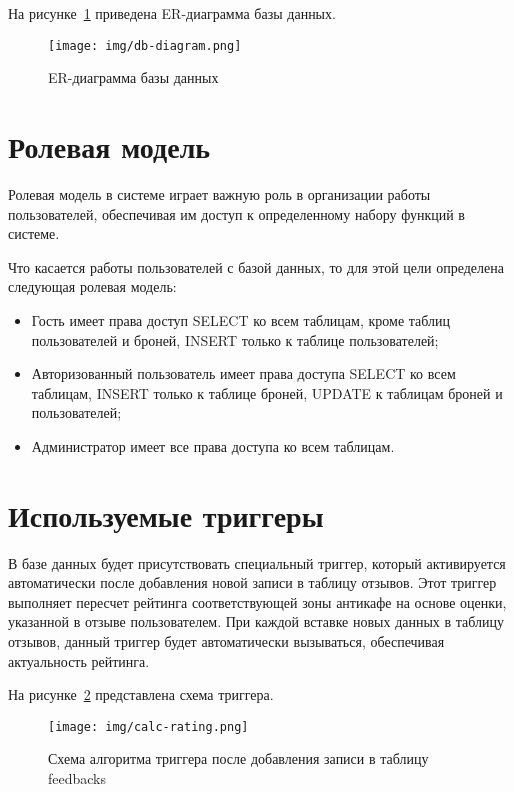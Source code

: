 На рисунке~\ref{fig:db} приведена ER-диаграмма базы данных.
\begin{figure}[h]
	\centering
	\texttt{[image: img/db-diagram.png]}
	\caption{ER-диаграмма базы данных}
	\label{fig:db}
\end{figure}

\section{Ролевая модель}

Ролевая модель в системе играет важную роль в организации работы пользователей, обеспечивая им доступ к определенному набору функций в системе.

Что касается работы пользователей с базой данных, то для этой цели определена следующая ролевая модель:

\begin{itemize}
	\item Гость имеет права доступ SELECT ко всем таблицам, кроме таблиц пользователей и броней, INSERT только к таблице пользователей;
	\item Авторизованный пользователь имеет права доступа SELECT ко всем таблицам, INSERT только к таблице броней, UPDATE к таблицам броней и пользователей;
	\item Администратор имеет все права доступа ко всем таблицам.
\end{itemize}

\section{Используемые триггеры}

В базе данных будет присутствовать специальный триггер, который активируется автоматически после добавления новой записи в таблицу отзывов. Этот триггер выполняет пересчет рейтинга соответствующей зоны антикафе на основе оценки, указанной в отзыве пользователем. При каждой вставке новых данных в таблицу отзывов, данный триггер будет автоматически вызываться, обеспечивая актуальность рейтинга.

\clearpage

На рисунке~\ref{trigger:calcrating} представлена схема триггера.

\begin{figure}[h]
	\centering
	\texttt{[image: img/calc-rating.png]}
	\caption{Схема алгоритма триггера после добавления записи в таблицу feedbacks}
	\label{trigger:calcrating}
\end{figure}

